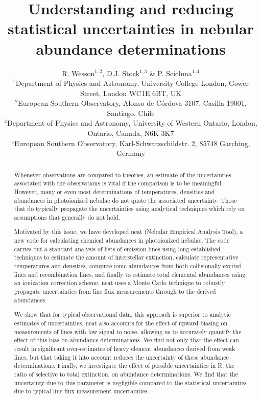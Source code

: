 \documentclass[useAMS,usenatbib]{mn2e}
\title[Statistical uncertainties in nebular abundances]{Understanding and reducing statistical uncertainties in nebular abundance determinations} %
\author[R. Wesson et al.]{R. Wesson$^{1,2}$, D.J. Stock$^{1,3}$ \& P. Scicluna$^{1,4}$\\
$^1$Department of Physics and Astronomy, University College London, Gower Street, London WC1E 6BT, UK\\
$^2$European Southern Observatory, Alonso de C\'ordova 3107, Casilla 19001, Santiago, Chile\\
$^3$Department of Physics and Astronomy, University of Western Ontario, London, Ontario, Canada, N6K 3K7\\
$^4$European Southern Observatory, Karl-Schwarzschildstr. 2, 85748 Garching, Germany\\ 
}
\begin{document}
\date{}

\pagerange{\pageref{firstpage}--\pageref{lastpage}} 

\maketitle

\label{firstpage}

\begin{abstract}
Whenever observations are compared to theories, an estimate of the uncertainties associated with the observations is vital if the comparison is to be meaningful.  However, many or even most determinations of temperatures, densities and abundances in photoionized nebulae do not quote the associated uncertainty.  Those that do typically propagate the uncertainties using analytical techniques which rely on assumptions that generally do not hold.

Motivated by this issue, we have developed {\sc neat} (Nebular Empirical Analysis Tool), a new code for calculating chemical abundances in photoionized nebulae.  The code carries out a standard analysis of lists of emission lines using long-established techniques to estimate the amount of interstellar extinction, calculate representative temperatures and densities, compute ionic abundances from both collisionally excited lines and recombination lines, and finally to estimate total elemental abundances using an ionization correction scheme.  {\sc neat} uses a Monte Carlo technique to robustly propagate uncertainties from line flux measurements through to the derived abundances.

We show that for typical observational data, this approach is superior to analytic estimates of uncertainties.  {\sc neat} also accounts for the effect of upward biasing on measurements of lines with low signal to noise, allowing us to accurately quantify the effect of this bias on abundance determinations.  We find not only that the effect can result in significant over-estimates of heavy element abundances derived from weak lines, but that taking it into account reduces the uncertainty of these abundance determinations.  Finally, we investigate the effect of possible uncertainties in R, the ratio of selective to total extinction, on abundance determinations.  We find that the uncertainty due to this parameter is negligible compared to the statistical uncertainties due to typical line flux measurement uncertainties.

\end{abstract}
\end{document}
